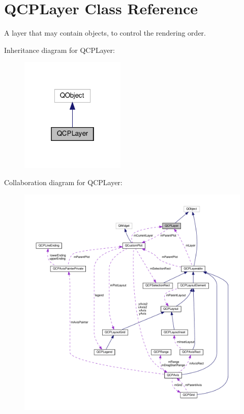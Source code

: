 \hypertarget{classQCPLayer}{}\section{Q\+C\+P\+Layer Class Reference}
\label{classQCPLayer}


A layer that may contain objects, to control the rendering order.  




Inheritance diagram for Q\+C\+P\+Layer\+:\nopagebreak
\begin{figure}[H]
\begin{center}
\leavevmode
\includegraphics[width=142pt]{classQCPLayer__inherit__graph}
\end{center}
\end{figure}


Collaboration diagram for Q\+C\+P\+Layer\+:\nopagebreak
\begin{figure}[H]
\begin{center}
\leavevmode
\includegraphics[width=350pt]{classQCPLayer__coll__graph}
\end{center}
\end{figure}
